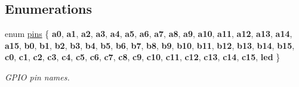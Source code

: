 \subsection*{Enumerations}
\begin{DoxyCompactItemize}
\item 
\mbox{\label{namespacestm32f103c8_a69d642506db309a7e64295d35ec21ff6}} 
enum \hyperlink{namespacestm32f103c8_a69d642506db309a7e64295d35ec21ff6}{pins} \{ \newline
{\bfseries a0}, 
{\bfseries a1}, 
{\bfseries a2}, 
{\bfseries a3}, 
\newline
{\bfseries a4}, 
{\bfseries a5}, 
{\bfseries a6}, 
{\bfseries a7}, 
\newline
{\bfseries a8}, 
{\bfseries a9}, 
{\bfseries a10}, 
{\bfseries a11}, 
\newline
{\bfseries a12}, 
{\bfseries a13}, 
{\bfseries a14}, 
{\bfseries a15}, 
\newline
{\bfseries b0}, 
{\bfseries b1}, 
{\bfseries b2}, 
{\bfseries b3}, 
\newline
{\bfseries b4}, 
{\bfseries b5}, 
{\bfseries b6}, 
{\bfseries b7}, 
\newline
{\bfseries b8}, 
{\bfseries b9}, 
{\bfseries b10}, 
{\bfseries b11}, 
\newline
{\bfseries b12}, 
{\bfseries b13}, 
{\bfseries b14}, 
{\bfseries b15}, 
\newline
{\bfseries c0}, 
{\bfseries c1}, 
{\bfseries c2}, 
{\bfseries c3}, 
\newline
{\bfseries c4}, 
{\bfseries c5}, 
{\bfseries c6}, 
{\bfseries c7}, 
\newline
{\bfseries c8}, 
{\bfseries c9}, 
{\bfseries c10}, 
{\bfseries c11}, 
\newline
{\bfseries c12}, 
{\bfseries c13}, 
{\bfseries c14}, 
{\bfseries c15}, 
\newline
{\bfseries led}
 \}\begin{DoxyCompactList}\small\item\em G\+P\+IO pin names. \end{DoxyCompactList}
\end{DoxyCompactItemize}
